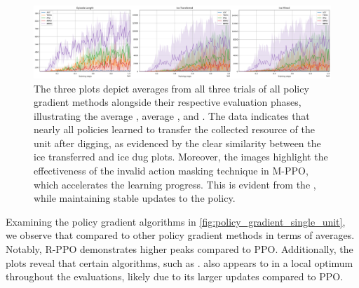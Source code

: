 \begin{figure}[htbp]
    \centering
        \centering
        \includegraphics[width=\linewidth]{images/results_singleunit/policy_gradient_single_unit.png}
        \captionsetup{justification=justified, singlelinecheck=false, width=1\linewidth, labelfont=bf} 
        \caption{The three plots depict averages from all three trials of all policy gradient methods alongside their respective evaluation phases, illustrating the average , average , and . The data indicates that nearly all policies learned to transfer the collected resource of the unit after digging, as evidenced by the clear similarity between the ice transferred and ice dug plots. Moreover, the images highlight the effectiveness of the invalid action masking technique in M-PPO, which accelerates the learning progress. This is evident from the , while maintaining stable updates to the policy.}
        \label{fig:policy_gradient_single_unit}
\end{figure}

\noindent Examining the policy gradient algorithms in \autoref{fig:policy_gradient_single_unit}, we observe that  compared to other policy gradient methods in terms of averages. Notably, R-PPO demonstrates higher peaks compared to PPO. Additionally, the plots reveal that certain algorithms, such as .  also appears to  in a local optimum throughout the evaluations, likely due to its larger updates compared to PPO.

\bigskip

